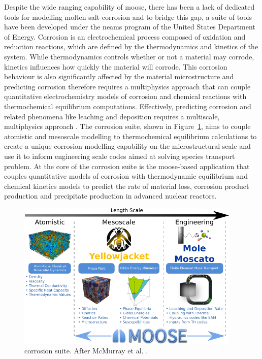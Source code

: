 	Despite the wide ranging capability of \gls{moose}, there has been a lack of dedicated tools for modelling molten salt corrosion and to bridge this gap, a suite of tools have been developed under the \gls{neams} program of the United States Department of Energy. Corrosion is an electrochemical process composed of oxidation and reduction reactions, which are defined by the thermodynamics and kinetics of the system. While thermodynamics controls whether or not a material may corrode, kinetics influences how quickly the material will corrode. This corrosion behaviour is also significantly affected by the material microstructure and predicting corrosion therefore requires a multiphysics approach that can couple quantitative electrochemistry models of corrosion and chemical reactions with thermochemical equilibrium computations. Effectively, predicting corrosion and related phenomena like leaching and deposition requires a multiscale, multiphysics approach \cite{Mcmurray:2018aa}. The corrosion suite, shown in Figure~\ref{fig:yj_suite}, aims to couple atomistic and mesoscale modelling to thermochemical equilibrium calculations to create a unique corrosion modelling capability on the microstructural scale and use it to inform engineering scale codes aimed at solving species transport problem. At the core of the corrosion suite is the \gls{moose}-based application {\YJ} that couples quantitative models of corrosion with thermodynamic equilibrium and chemical kinetics models to predict the rate of material loss, corrosion product production and precipitate production in advanced nuclear reactors. 
	\begin{figure}[htb]
		\centering
		\includegraphics[width=0.95\textwidth]{figures/chapter-1/Yellowjacket_Suite.png}
		\caption[{\YJ} corrosion suite.]{{\YJ} corrosion suite. After McMurray et al. \cite{McMurray:2020aa}.}
		\label{fig:yj_suite}
	\end{figure}
 
